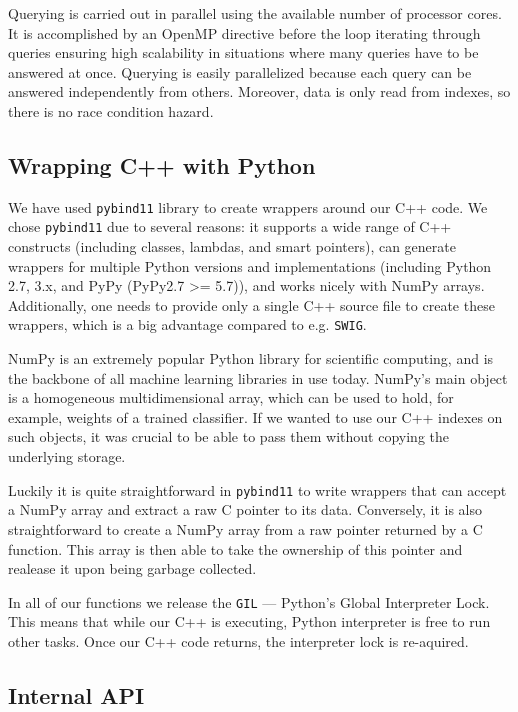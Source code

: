 Querying is carried out in parallel using the available number of processor cores.
It is accomplished by an OpenMP directive
before the loop iterating through queries ensuring high scalability in situations
where many queries have to be answered at once.
Querying is easily parallelized because each query can be answered independently from others.
Moreover, data is only read from indexes, so there is no race condition hazard.

\subsection{Wrapping C++ with Python}

We have used \texttt{pybind11}\cite{pybind11} library to create wrappers around our C++ code. We chose \texttt{pybind11}
due to several reasons: it supports a wide range of C++ constructs
(including classes, lambdas, and smart pointers), can generate wrappers for multiple Python versions and
implementations (including Python 2.7, 3.x, and PyPy (PyPy2.7 >= 5.7)), and works nicely with NumPy arrays.
Additionally, one needs to provide only a single C++ source file to create these wrappers, which is
a big advantage compared to e.g. \texttt{SWIG}.

NumPy is an extremely popular Python library for scientific computing, and is the backbone of all
machine learning libraries in use today. NumPy’s main object is a homogeneous multidimensional array, which
can be used to hold, for example, weights of a trained classifier. If we wanted to use our C++ indexes on such
objects, it was crucial to be able to pass them without copying the underlying storage.

Luckily it is quite straightforward in \texttt{pybind11} to write wrappers that can accept a NumPy array
and extract a raw C pointer to its data. Conversely, it is also straightforward to create
a NumPy array from a raw pointer returned by a C function. This array is then able to take the
ownership of this pointer and realease it upon being garbage collected.

In all of our functions we release the \texttt{GIL} --- Python's Global Interpreter Lock. This means that while our
C++ is executing, Python interpreter is free to run other tasks. Once our C++ code returns, the
interpreter lock is re-aquired.

\subsection{Internal API}

